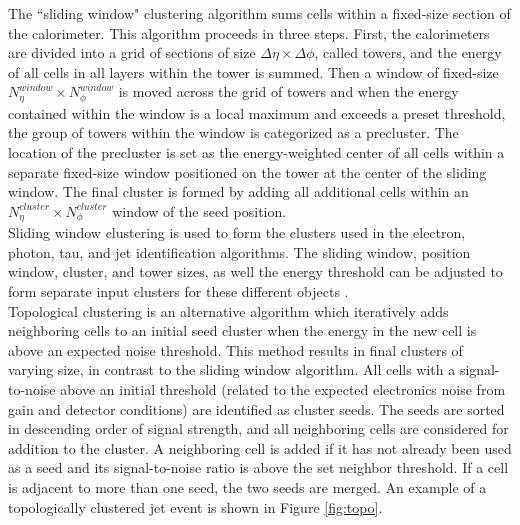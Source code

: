 The ``sliding window" clustering algorithm sums cells within a fixed-size section of the calorimeter. This algorithm proceeds in three steps. First, the calorimeters are divided into a grid of sections of size $\Delta\eta\times\Delta\phi$, called towers, and the energy of all cells in all layers within the tower is summed. Then a window of fixed-size $N_{\eta}^{window}\times N_{\phi}^{window}$ is moved across the grid of towers and when the energy contained within the window is a local maximum and exceeds a preset threshold, the group of towers within the window is categorized as a precluster. The location of the precluster is set as the energy-weighted center of all cells within a separate fixed-size window positioned on the tower at the center of the sliding window. The final cluster is formed by adding all additional cells within an $N_{\eta}^{cluster}\times N_{\phi}^{cluster}$ window of the seed position.\\ 

Sliding window clustering is used to form the clusters used in the  electron, photon, tau, and jet identification algorithms. The sliding window, position window, cluster, and tower sizes, as well the energy threshold can be adjusted to form separate input clusters for these different objects \cite{calo_clustering}.\\

 Topological clustering is an alternative algorithm which iteratively adds neighboring cells to an initial seed cluster when the energy in the new cell is above an expected noise threshold. This method results in final clusters of varying size, in contrast to the sliding window algorithm. All cells with a signal-to-noise above an initial threshold (related to the expected electronics noise from gain and detector conditions) are identified as cluster seeds. The seeds are sorted in descending order of signal strength, and all neighboring cells are considered for addition to the cluster. A neighboring cell is added if it has not already been used as a seed and its signal-to-noise ratio is above the set neighbor threshold. If a cell is adjacent to more than one seed, the two seeds are merged. An example of a topologically clustered jet event is shown in Figure \ref{fig:topo}.\\

